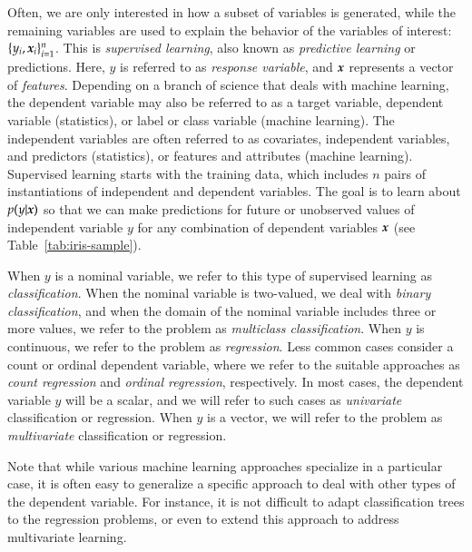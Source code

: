 \begin{refsection}
Often, we are only interested in how a subset of variables is generated, while the remaining variables are used to explain the behavior of the variables of interest: $\{y_i, \boldsymbol{x}_i\}_{i=1}^n$. This is {\em supervised learning}, also known as {\em predictive learning} or {\rm predictions}. Here, $y$ is referred to as {\em response variable}, and $\boldsymbol{x}$ represents a vector of {\em features}. Depending on a branch of science that deals with machine learning, the dependent variable may also be referred to as a target variable, dependent variable (statistics), or label or class variable (machine learning). The independent variables are often referred to as covariates, independent variables, and predictors (statistics), or features and attributes (machine learning). Supervised learning starts with the training data, which includes $n$ pairs of instantiations of independent and dependent variables. The goal is to learn about $p(y|\boldsymbol{x})$ so that we can make predictions for future or unobserved values of independent variable $y$ for any combination of dependent variables $\boldsymbol{x}$ (see Table~\ref{tab:iris-sample}).

When $y$ is a nominal variable, we refer to this type of supervised learning as {\em classification}. When the nominal variable is two-valued, we deal with {\em binary classification}, and when the domain of the nominal variable includes three or more values, we refer to the problem as {\em multiclass classification}. When $y$ is continuous, we refer to the problem as {\em regression}. Less common cases consider a count or ordinal dependent variable, where we refer to the suitable approaches as {\em count regression} and {\em ordinal regression}, respectively. In most cases, the dependent variable $y$ will be a scalar, and we will refer to such cases as {\em univariate} classification or regression. When $y$ is a vector, we will refer to the problem as {\em multivariate} classification or regression.

Note that while various machine learning approaches specialize in a particular case, it is often easy to generalize a specific approach to deal with other types of the dependent variable. For instance, it is not difficult to adapt classification trees to the regression problems, or even to extend this approach to address multivariate learning.


\end{refsection}
